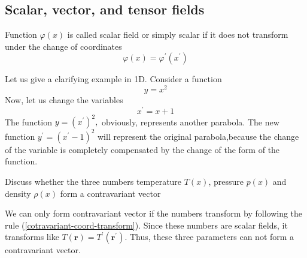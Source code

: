 \subsection{Scalar, vector, and tensor fields}
\begin{defi}
        Function $\varphi(x)$ is called scalar field or simply scalar if it does not transform under the change of coordinates
        \begin{equation}
\varphi(x)=\varphi^{\prime}\left(x^{\prime}\right)
\end{equation}
\end{defi}
Let us give a clarifying example in 1D. Consider a function
$$
y=x^2
$$
Now, let us change the variables 
$$
x^{\prime}=x+1
$$
The function $y=\left(x^{\prime}\right)^{2},$ obviously, represents another parabola.  The new function $y^{\prime}=\left(x^{\prime}-1\right)^{2}$ will represent the original parabola,because the change of the variable is completely compensated by the change of the form of the function.
\begin{mybox}
\begin{center}
    Discuss whether the three numbers temperature $T(x)$, pressure $p(x)$ and density $\rho(x)$ form a contravariant vector
\end{center}
\end{mybox}
\begin{mybox2}
We can only form contravariant vector if the numbers transform by following the rule (\ref{cotravariant-coord-transform}). Since these numbers are scalar fields, it transforms like $T(\mathbf{r})=T^{\prime}(\mathbf{r}^{\prime})$. Thus, these three parameters can not form a contravariant vector.
\end{mybox2}
